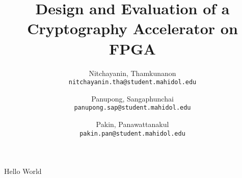 \documentclass[a4paper]{article} %
\title{Design and Evaluation of a Cryptography Accelerator on FPGA}
\author{
	Nitchayanin, Thamkunanon\\
	\texttt{nitchayanin.tha@student.mahidol.edu} 
	\and
	Panupong, Sangaphunchai\\
	\texttt{panupong.sap@student.mahidol.edu}
	\and
	Pakin, Panawattanakul\\
	\texttt{pakin.pan@student.mahidol.edu}
}
\begin{document}
	\maketitle
	Hello World
	
\end{document}
